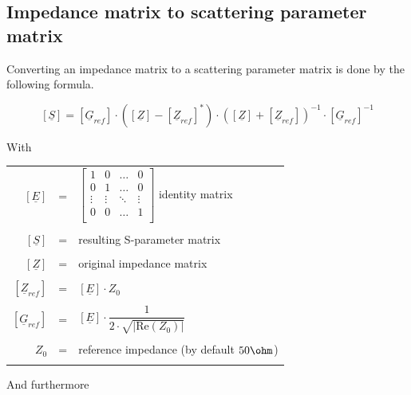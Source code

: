 \documentclass[10pt]{report}
\begin{document}
\subsection{Impedance matrix to scattering parameter matrix}

Converting an impedance matrix to a scattering parameter matrix is
done by the following formula.

\begin{equation}
\left[
\underline{S}
\right]
=
\left[
\underline{G}_{ref}
\right]
\cdot
\left(
\left[\underline{Z}\right] - \left[\underline{Z}_{ref}\right]^{*}
\right)
\cdot
\left(
\left[\underline{Z}\right] + \left[\underline{Z}_{ref}\right]
\right)^{-1}
\cdot
\left[\underline{G}_{ref}\right]^{-1}
\end{equation}

With

\addvspace{12pt}

\begin{tabular}{rll}
$\left[\underline{E}\right]$ & = &
$\begin{bmatrix}
1 & 0 & \ldots & 0\\
0 & 1 & \ldots & 0\\
\vdots & \vdots & \ddots & \vdots\\
0 & 0 & \ldots & 1\\
\end{bmatrix}$
identity matrix\\& &\\
$\left[\underline{S}\right]$ & = & resulting S-parameter matrix\\& &\\
$\left[\underline{Z}\right]$ & = & original impedance matrix\\& &\\
$\left[\underline{Z}_{ref}\right]$ & = &
$\left[\underline{E}\right] \cdot Z_{0}$\\& &\\
$\left[\underline{G}_{ref}\right]$ & = &
$\left[\underline{E}\right] \cdot 
\dfrac{1}{2\cdot \sqrt{\left| \text{Re}\left(Z_{0}\right)\right|}}$\\& &\\
$Z_{0}$ & = & reference impedance (by default $50\ohm$)\\& &\\
\end{tabular}

And furthermore

\addvspace{12pt}
\end{document}
